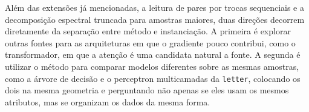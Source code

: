 Além das extensões já mencionadas, a leitura de pares por trocas sequenciais e a decomposição espectral truncada para amostras maiores, duas direções decorrem diretamente da separação entre método e instanciação. A primeira é explorar outras fontes para as arquiteturas em que o gradiente pouco contribui, como o transformador, em que a atenção é uma candidata natural a fonte. A segunda é utilizar o método para comparar modelos diferentes sobre as mesmas amostras, como a árvore de decisão e o perceptron multicamadas da \texttt{letter}, colocando os dois na mesma geometria e perguntando não apenas se eles usam os mesmos atributos, mas se organizam os dados da mesma forma.

